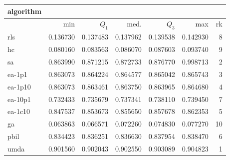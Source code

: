 \begin{tabular}{@{}l*{5}{>{{}}N{1}{3}}>{{}}N{2}{0}@{}}
\toprule
{algorithm} &  \\
\midrule
& {min} & {$Q_1$} & {med.} & {$Q_3$} & {max} & {rk}\\
\midrule
rls & 0.136730 & 0.137483 & 0.137962 & 0.139538 & 0.142930 & 8\\
hc & 0.080160 & 0.083563 & 0.086070 & 0.087603 & 0.093740 & 9\\
sa & 0.863990 & 0.871215 & 0.872733 & 0.876770 & {\color{blue}} 0.998713 & 2\\
ea-1p1 & 0.863073 & 0.864224 & 0.864577 & 0.865042 & 0.865743 & 3\\
ea-1p10 & 0.863073 & 0.863461 & 0.863750 & 0.863965 & 0.864680 & 4\\
ea-10p1 & 0.732433 & 0.735679 & 0.737341 & 0.738110 & 0.739450 & 7\\
ea-1c10 & 0.847537 & 0.853673 & 0.855650 & 0.857678 & 0.862353 & 5\\
ga & 0.063863 & 0.066571 & 0.072260 & 0.074830 & 0.077270 & 10\\
pbil & 0.834423 & 0.836251 & 0.836630 & 0.837954 & 0.838470 & 6\\
umda & {\color{blue}} 0.901560 & {\color{blue}} 0.902043 & {\color{blue}} 0.902550 & {\color{blue}} 0.903089 & 0.904823 & 1\\
\bottomrule
\end{tabular}
